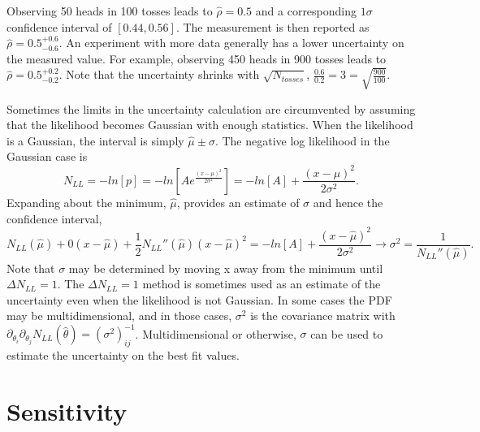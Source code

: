 Observing 50 heads in 100 tosses leads to $\hat{\rho} = 0.5$ and a corresponding $1\sigma$ confidence interval of $[0.44, 0.56]$. The measurement is then reported as $\hat{\rho} = 0.5^{+0.6}_{-0.6}$. An experiment with more data generally has a lower uncertainty on the measured value. For example, observing 450 heads in 900 tosses leads to $\hat{\rho} = 0.5^{+0.2}_{-0.2}$. Note that the uncertainty shrinks with $\sqrt{N_{tosses}}$, $\frac{0.6}{0.2} = 3 = \sqrt{\frac{900}{100}}$.

Sometimes the limits in the uncertainty calculation are circumvented by assuming that the likelihood becomes Gaussian with enough statistics. When the likelihood is a Gaussian, the interval is simply $\hat{\mu} \pm \sigma$. The negative log likelihood in the Gaussian case is
\begin{equation}
N_{LL} = -ln[p] = -ln\left[Ae^{\frac{(x-\mu)^2}{2\sigma^2}}\right]= -ln[A] + \frac{(x-\mu)^2}{2\sigma^2}.
\end{equation}
Expanding about the minimum, $\hat{\mu}$, provides an estimate of $\sigma$ and hence the confidence interval, 
\begin{equation}
N_{LL}(\hat{\mu}) + 0(x-\hat{\mu}) + \frac{1}{2}N_{LL}''(\hat{\mu})(x-\hat{\mu})^2 = -ln[A] + \frac{(x-\hat{\mu})^2}{2\sigma^2} \rightarrow \sigma^2 = \frac{1}{N_{LL}''(\hat{\mu})}.
\end{equation}
Note that $\sigma$ may be determined by moving x away from the minimum until $\Delta N_{LL} = 1$. The $\Delta N_{LL} = 1$ method is sometimes used as an estimate of the uncertainty even when the likelihood is not Gaussian. In some cases the PDF may be multidimensional, and in those cases, $\sigma^2$ is the covariance matrix with $\partial_{\theta_i}\partial_{\theta_j}N_{LL}(\hat{\theta}) = (\sigma^2)^{-1}_{ij}$. Multidimensional or otherwise, $\sigma$ can be used to estimate the uncertainty on the best fit values. 

\section{Sensitivity}

